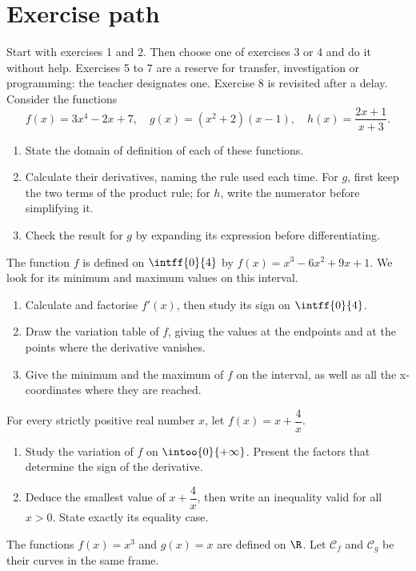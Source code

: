 \section*{Exercise path}\label{C06-PARC}
Start with exercises 1 and 2. Then choose one of exercises 3 or 4 and do it without help. Exercises 5 to 7 are a reserve for transfer, investigation or programming: the teacher designates one. Exercise 8 is revisited after a delay.
\begingroup
{}
Consider the functions\[f(x)=3x^4-2x+7,\quad g(x)=(x^2+2)(x-1),\quad h(x)=\dfrac{2x+1}{x+3}.\]
\begin{enumerate}[label=\arabic*.]
\item State the domain of definition of each of these functions.
\item Calculate their derivatives, naming the rule used each time. For $g$, first keep the two terms of the product rule; for $h$, write the numerator before simplifying it.
\item Check the result for $g$ by expanding its expression before differentiating.
\end{enumerate}
The function $f$ is defined on $\intff{0}{4}$ by $f(x)=x^3-6x^2+9x+1$. We look for its minimum and maximum values on this interval.
\begin{enumerate}[label=\arabic*.]
\item Calculate and factorise $f\prime(x)$, then study its sign on $\intff{0}{4}$.
\item Draw the variation table of $f$, giving the values at the endpoints and at the points where the derivative vanishes.
\item Give the minimum and the maximum of $f$ on the interval, as well as all the x-coordinates where they are reached.
\end{enumerate}
For every strictly positive real number $x$, let $f(x)=x+\dfrac4x$.
\begin{enumerate}[label=\arabic*.]
\item Study the variation of $f$ on $\intoo{0}{+\infty}$. Present the factors that determine the sign of the derivative.
\item Deduce the smallest value of $x+\dfrac4x$, then write an inequality valid for all $x>0$. State exactly its equality case.
\end{enumerate}
The functions $f(x)=x^3$ and $g(x)=x$ are defined on $\R$. Let $\mathcal C_f$ and $\mathcal C_g$ be their curves in the same frame.
